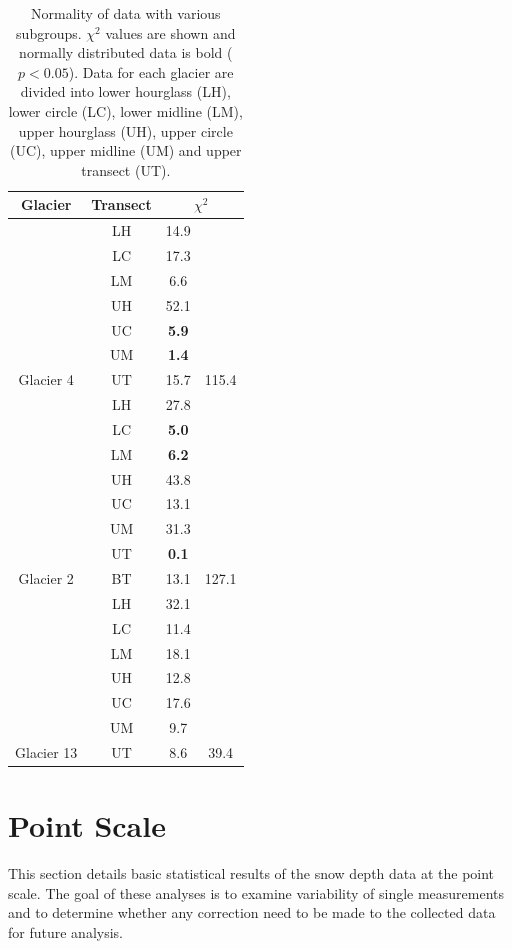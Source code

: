 \documentclass{sfuthesis}
\newcommand{\transectAbb}{Data for each glacier are divided into lower hourglass (LH), lower circle (LC), lower midline (LM), upper hourglass (UH), upper circle (UC), upper midline (UM) and upper transect (UT).}
\begin{document}
\begin{appendices}
\begin{table}
\centering
\caption[]{Normality of data with various subgroups. $\chi^2$ values are shown and normally distributed data is bold ($p<0.05$). \transectAbb}
\label{tab:normality}
\begin{tabular}{cccc}
\textbf{Glacier} & \textbf{Transect} & \multicolumn{2}{c}{\textbf{$\chi^2$}} \\ 
\hline
\hline 
& LH & 14.9 &   \\
  & LC & 17.3 &   \\
  & LM & 6.6 &   \\
  & UH & 52.1 &   \\
  & UC & \textbf{5.9} &   \\
& UM & \textbf{1.4} &   \\
\multirow{-7}{*}{Glacier 4} & UT & 15.7 & \multirow{-7}{*}{ 115.4} \\ \hline
 & LH & 27.8 &  \\
 & LC & \textbf{5.0} &  \\
 & LM & \textbf{6.2} &  \\
 & UH & 43.8 &  \\
 & UC & 13.1 &  \\
 & UM & 31.3 &  \\
 & UT & \textbf{0.1} &  \\
\multirow{-8}{*}{Glacier 2} & BT & 13.1 & \multirow{-8}{*}{127.1} \\ \hline
  
  & LH & 32.1 &   \\ 
  
  & LC & 11.4 &   \\
  
  & LM & 18.1 &   \\
  
  & UH & 12.8 &   \\
  
  & UC & 17.6 &   \\
  
  & UM & 9.7 &   \\
  
\multirow{-7}{*}{ Glacier 13} & UT & 8.6 & \multirow{-7}{*}{ 39.4}
\end{tabular}
\end{table}

\section{Point Scale}

This section details basic statistical results of the snow depth data at the point scale. The goal of these analyses is to examine variability of single measurements and to determine whether any correction need to be made to the collected data for future analysis. 


\end{appendices}
\end{document}
